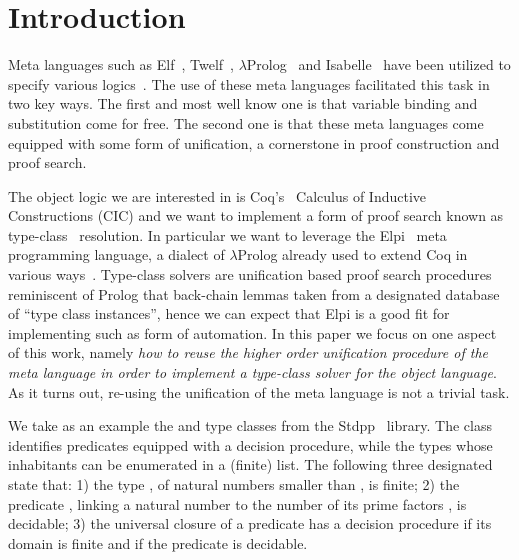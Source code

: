 \documentclass[sigconf,natbib=false,review]{acmart}
\begin{document}

\maketitle

\section{Introduction}
\label{sec:intro}

Meta languages such as Elf~\cite{elf}, Twelf~\cite{twelf},
$\lambda$Prolog~\cite{miller_nadathur_2012} and
Isabelle~\cite{10.1007/978-3-540-71067-7_7}
have been utilized to specify various
logics~\cite{felty88cade,books/sp/NipkowPW02,10.1007/BF00881873,felty93lics}.
The use of these meta languages facilitated this task in two
key ways. The first and most well know one is that variable binding and
substitution come for free. %
The second one is that these meta languages come equipped with some form
of unification, a cornerstone in proof construction and proof search.

The object logic we are interested in is Coq's~\cite{Coq-refman}
Calculus of Inductive Constructions (CIC) and we want to implement a
form of proof search known as type-class~\cite{wadler89,sozeau08} resolution.
In particular we want to leverage the Elpi~\cite{tassi:hal-01637063} meta programming language,
a dialect of $\lambda$Prolog already used to extend
Coq in various ways~\cite{tassi:hal-01637063,tassi:hal-01897468,gregoire:hal-03800154,newtc}.
Type-class solvers are unification based proof search procedures
reminiscent of Prolog that back-chain lemmas taken
from a designated database of ``type class instances'', hence
we can expect that Elpi is a good fit for
implementing such as form of automation. In this paper we focus on one aspect of
this work, namely \emph{how to reuse the higher order unification procedure
of the meta language in order to implement a type-class solver for the object
language}. As it turns out, re-using the unification of the meta language is
not a trivial task.

We take as an example the  and  type classes
from the Stdpp~\cite{JUNG_KREBBERS_JOURDAN_BIZJAK_BIRKEDAL_DREYER_2018}
library. The class  
identifies predicates equipped with a decision procedure, while
 the types whose inhabitants can be enumerated in a (finite) list.
The following three designated  state that:
1) the type , of natural numbers
smaller than , is finite;
2) the predicate , linking a natural number
 to the number of its prime factors , is decidable;
3) the universal closure of a predicate has a decision procedure if
its domain is finite and if the predicate is decidable.
\end{document}
